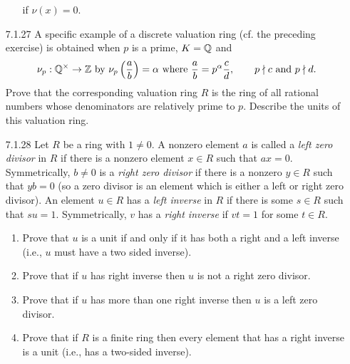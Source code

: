 \begin{enumerate}
\begin{enumerate}
                           if $\nu(x) = 0$.
                  \end{enumerate}
   \item[7.1.27]  A specific example of a discrete valuation ring (cf. the
                  preceding exercise) is obtained when $p$ is a prime, $K = \mathbb{Q}$
                  and
                  $$\nu_p : \mathbb{Q}^\times \rightarrow \mathbb{Z} \text{ by }
                    \nu_p\left(\frac{a}{b}\right) = \alpha \text{ where }
                    \frac{a}{b} = p^\alpha\frac{c}{d}, \qquad p \nmid c
                    \text{ and } p \nmid d.$$
                  Prove that the corresponding valuation ring $R$ is the ring of
                  all rational numbers whose denominators are relatively prime
                  to $p$. Describe the units of this valuation ring.
   \item[7.1.28]  Let $R$ be a ring with $1 \neq 0$. A nonzero element $a$ is
                  called a \textit{left zero divisor} in $R$ if there is a
                  nonzero element $x \in R$ such that $ax = 0$. Symmetrically,
                  $b \neq 0$ is a \textit{right zero divisor} if there is a
                  nonzero $y \in R$ such that $yb = 0$ (so a zero divisor is an
                  element which is either a left or right zero divisor). An
                  element $u \in R$ has a \textit{left inverse} in $R$ if there
                  is some $s \in R$ such that $su = 1$. Symmetrically, $v$ has
                  a \textit{right inverse} if $vt = 1$ for some $t \in R$.
                  \begin{enumerate}
                     \item Prove that $u$ is a unit if and only if it has both a
                           right and a left inverse (i.e., $u$ must have a two
                           sided inverse).
                     \item Prove that if $u$ has right inverse then $u$ is not
                           a right zero divisor.
                     \item Prove that if $u$ has more than one right inverse
                           then $u$ is a left zero divisor.
                     \item Prove that if $R$ is a finite ring then every element
                           that has a right inverse is a unit (i.e., has a
                           two-sided inverse).

\end{enumerate}
\end{enumerate}

